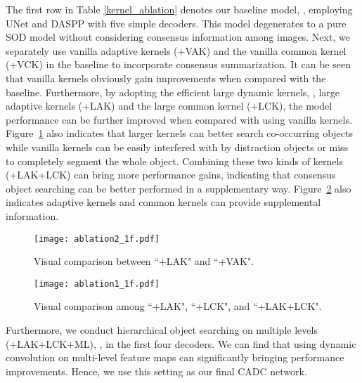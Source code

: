 \documentclass[10pt,twocolumn,letterpaper]{article}
\begin{document}
The first row in Table \ref{kernel_ablation} denotes our baseline model, \ie, employing UNet and DASPP with five simple decoders. This model degenerates to a pure SOD model without considering consensus information among images. Next, we separately use vanilla adaptive kernels (+VAK) and the vanilla common kernel (+VCK) in the baseline to incorporate consensus summarization. It can be seen that vanilla kernels obviously gain improvements when compared with the baseline. Furthermore, by adopting the efficient large dynamic kernels, \ie, large adaptive kernels (+LAK) and the large common kernel (+LCK), the model performance can be further improved when compared with using vanilla kernels. Figure~\ref{abl_large_range} also indicates that larger kernels can better search co-occurring objects while vanilla kernels can be easily interfered with by distraction objects or miss to completely segment the whole object. Combining these two kinds of kernels (+LAK+LCK) can bring more performance gains, indicating that consensus object searching can be better performed in a supplementary way. Figure~\ref{ab_supplement} also indicates adaptive kernels and common kernels can provide supplemental information.

\begin{figure}[t]
  \graphicspath{{Figures/ablation/}}
  \centering
  \texttt{[image: ablation2\_1f.pdf]}
  \caption{Visual comparison between ``+LAK" and ``+VAK".}
  \label{abl_large_range}
  \vspace{-0.3cm}
\end{figure}


\begin{figure}[t]
  \graphicspath{{Figures/ablation/}}
  \centering
  \texttt{[image: ablation1\_1f.pdf]}
  \caption{Visual comparison among ``+LAK", ``+LCK", and ``+LAK+LCK".}
  \label{ab_supplement}
  \vspace{-0.3cm}
\end{figure}

Furthermore, we conduct hierarchical object searching on multiple levels (+LAK+LCK+ML), \ie, in the first four decoders. We can find that using dynamic convolution on multi-level feature maps can significantly bringing performance improvements.
Hence, we use this setting as our final CADC network.

\vspace{-3mm}
\end{document}
